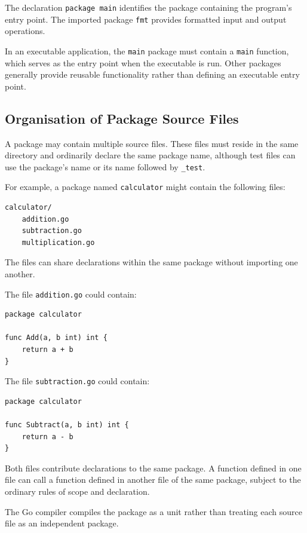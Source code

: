The declaration \texttt{package main} identifies the package containing the program's entry point. The imported package \texttt{fmt} provides formatted input and output operations.

In an executable application, the \texttt{main} package must contain a \texttt{main} function, which serves as the entry point when the executable is run. Other packages generally provide reusable functionality rather than defining an executable entry point.

\subsection{Organisation of Package Source Files}

A package may contain multiple source files. These files must reside in the same directory and ordinarily declare the same package name, although test files can use the package's name or its name followed by \texttt{\_test}.

For example, a package named \texttt{calculator} might contain the following files:

\begin{lstlisting}
calculator/
    addition.go
    subtraction.go
    multiplication.go
\end{lstlisting}

The files can share declarations within the same package without importing one another.

The file \texttt{addition.go} could contain:

\begin{lstlisting}
package calculator

func Add(a, b int) int {
    return a + b
}
\end{lstlisting}

The file \texttt{subtraction.go} could contain:

\begin{lstlisting}
package calculator

func Subtract(a, b int) int {
    return a - b
}
\end{lstlisting}

Both files contribute declarations to the same package. A function defined in one file can call a function defined in another file of the same package, subject to the ordinary rules of scope and declaration.

The Go compiler compiles the package as a unit rather than treating each source file as an independent package.


